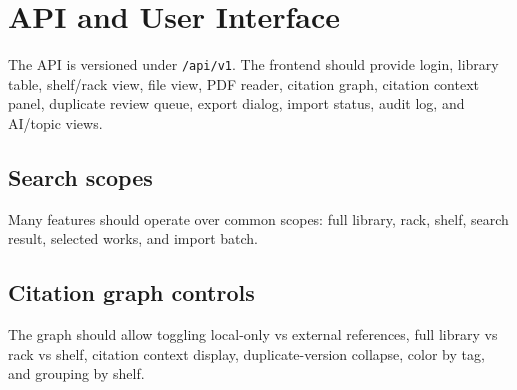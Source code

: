 \section{API and User Interface}

The API is versioned under \texttt{/api/v1}. The frontend should provide login, library table, shelf/rack view, file view, PDF reader, citation graph, citation context panel, duplicate review queue, export dialog, import status, audit log, and AI/topic views.

\subsection{Search scopes}

Many features should operate over common scopes: full library, rack, shelf, search result, selected works, and import batch.

\subsection{Citation graph controls}

The graph should allow toggling local-only vs external references, full library vs rack vs shelf, citation context display, duplicate-version collapse, color by tag, and grouping by shelf.
